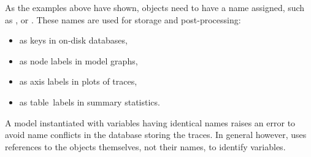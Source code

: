 \documentclass[]{jss}
\begin{document}
As the examples above have shown,   objects need to have a name 
assigned, such as ,  or . These names 
are used for storage and post-processing:
\begin{itemize}
 \item as keys in on-disk databases,
 \item as node labels in model graphs,
 \item as axis labels in plots of traces, 
 \item as table~labels in summary statistics. 
\end{itemize}
A model instantiated with variables having identical names raises an
error to avoid name conflicts in the database storing the traces. In
general however,   uses references to the objects themselves, not 
their names, to identify variables. 
\end{document}
